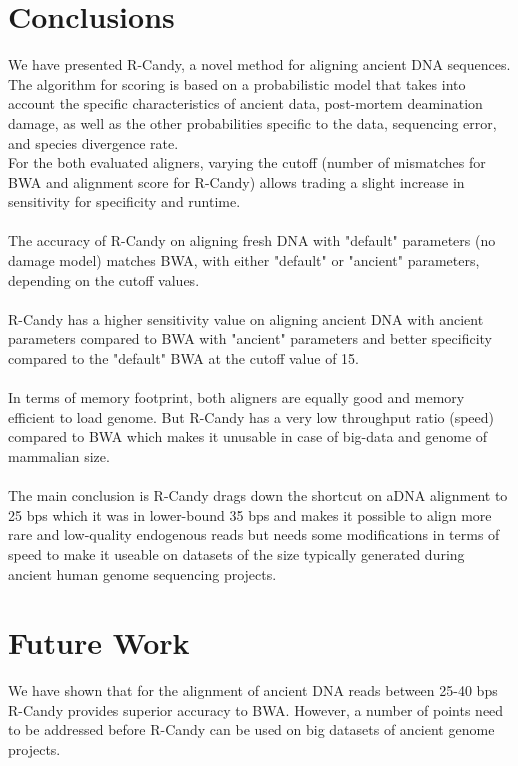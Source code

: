 \documentclass[11pt,a4paper]{report}
\begin{document}

\section{Conclusions} \label{Conclusions}


We have presented R-Candy, a novel method for aligning ancient DNA sequences.
The algorithm for scoring is based on a probabilistic model that takes into account 
the specific characteristics of ancient data, post-mortem deamination damage, as 
well as the other probabilities specific to the data, sequencing error, and species
divergence rate. 
\\
For the both evaluated aligners, varying the cutoff (number of mismatches for BWA 
and alignment score for R-Candy) allows trading a slight increase in sensitivity 
for specificity and runtime.
\\\\
The accuracy of R-Candy on aligning fresh DNA with "default" parameters (no damage model) 
matches BWA, with either "default" or "ancient" parameters, depending  on the cutoff values.
\\\\
R-Candy has a higher sensitivity value on aligning ancient DNA with ancient parameters
compared to BWA with "ancient" parameters and better specificity compared to the 
"default" BWA at the cutoff value of 15.
\\\\
In terms of memory footprint, both aligners are equally good and memory efficient
to load genome. But R-Candy has a very low throughput ratio (speed) compared to 
BWA which makes it unusable in case of big-data and genome of mammalian size. 
\\\\
The main conclusion is R-Candy drags down the shortcut on aDNA alignment to 25 bps 
which it was in lower-bound 35 bps and makes it possible to align more rare and 
low-quality endogenous reads but needs some modifications in terms of speed to 
make it useable on datasets of the size typically generated during ancient human
genome sequencing projects. 



 

\section{Future Work} \label{Future Work}
We have shown that for the alignment of ancient DNA reads between 25-40 
bps R-Candy provides superior accuracy to BWA.  
However, a number of points need to be addressed before R-Candy can be used 
on big datasets of ancient genome projects. 
\end{document}
